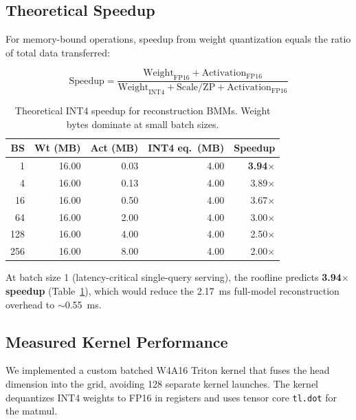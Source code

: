 \documentclass[10pt,twocolumn]{article}
\begin{document}
\subsection{Theoretical Speedup}

For memory-bound operations, speedup from weight quantization equals the ratio of total data transferred:

\begin{equation}
\text{Speedup} = \frac{\text{Weight}_\text{FP16} + \text{Activation}_\text{FP16}}{\text{Weight}_\text{INT4} + \text{Scale/ZP} + \text{Activation}_\text{FP16}}
\label{eq:speedup}
\end{equation}

\begin{table}[h]
\centering
\small
\caption{Theoretical INT4 speedup for reconstruction BMMs.  Weight bytes dominate at small batch sizes.}
\label{tab:int4_speedup}
\begin{tabular}{@{}rrrrr@{}}
\toprule
BS & Wt (MB) & Act (MB) & INT4 eq.\ (MB) & Speedup \\
\midrule
  1 & 16.00 & 0.03 & 4.00 & \textbf{3.94$\times$} \\
  4 & 16.00 & 0.13 & 4.00 & 3.89$\times$ \\
 16 & 16.00 & 0.50 & 4.00 & 3.67$\times$ \\
 64 & 16.00 & 2.00 & 4.00 & 3.00$\times$ \\
128 & 16.00 & 4.00 & 4.00 & 2.50$\times$ \\
256 & 16.00 & 8.00 & 4.00 & 2.00$\times$ \\
\bottomrule
\end{tabular}
\end{table}

At batch size 1 (latency-critical single-query serving), the roofline predicts \textbf{3.94$\times$ speedup} (Table~\ref{tab:int4_speedup}), which would reduce the 2.17~ms full-model reconstruction overhead to $\sim$0.55~ms.

\subsection{Measured Kernel Performance}

We implemented a custom batched W4A16 Triton kernel that fuses the head dimension into the grid, avoiding 128 separate kernel launches.  The kernel dequantizes INT4 weights to FP16 in registers and uses tensor core \texttt{tl.dot} for the matmul.
\end{document}
